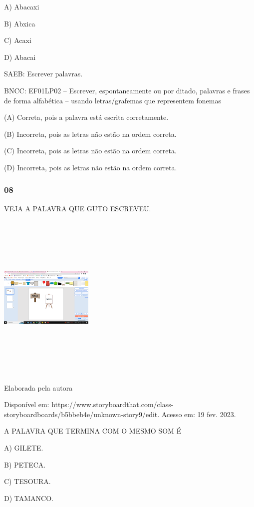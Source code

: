 A) Abacaxi

B) Abxica

C) Acaxi

D) Abacai

SAEB: Escrever palavras.

\protect\hypertarget{_heading=h.1v1yuxt}{}{}BNCC: EF01LP02 -- Escrever, espontaneamente ou por ditado, palavras e frases de forma
alfabética -- usando letras/grafemas que representem fonemas

(A) Correta, pois a palavra está escrita corretamente.

(B) Incorreta, pois as letras não estão na ordem correta.

(C) Incorreta, pois as letras não estão na ordem correta.

(D) Incorreta, pois as letras não estão na ordem correta.

\subsubsection{08}\label{section-33}

VEJA A PALAVRA QUE GUTO ESCREVEU.

\includegraphics[width=1.76042in,height=3.19514in]{media/image197.png}

Elaborada pela autora

Disponível
em: https://www.storyboardthat.com/class-storyboardboards/b5bbeb4e/unknown-story9/edit. Acesso em: 19 fev. 2023.

A PALAVRA QUE TERMINA COM O MESMO SOM É

A) GILETE.

B) PETECA.

C) TESOURA.

D) TAMANCO.

